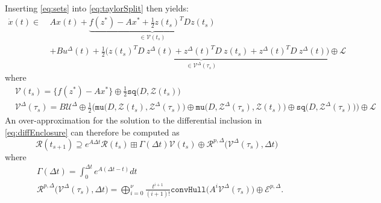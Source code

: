 \documentclass{article}
\begin{document}
Inserting \eqref{eq:sets} into \eqref{eq:taylorSplit} then yields:
\begin{equation}
	\begin{split}
	\dot x(t) \in ~& A x(t) + \underbrace{f(z^*) - A x^* + \frac{1}{2} z(t_s)^T D z(t_s)}_{\in \mathcal{V}(t_s)} \\
	& + \underbrace{B u^{\Delta}(t) + \frac{1}{2}\Big( z(t_s)^T D~ z^{\Delta}(t) + z^{\Delta}(t)^T D ~z(t_s) + z^{\Delta}(t)^T D ~z^{\Delta}(t) \Big) \oplus \mathcal{L}}_{\in \mathcal{V}^{\Delta}(\tau_s)} 
	\end{split}
	\label{eq:diffEnclosure}
\end{equation}
where
\begin{equation*}
	\begin{split}
		& \mathcal{V}(t_s) = \{ f(z^*) - A x^* \} \oplus \frac{1}{2} \texttt{sq}\big(D,\mathcal{Z}(t_s) \big) \\
		& \mathcal{V}^{\Delta}(\tau_s) = B \mathcal{U}^{\Delta} \oplus \frac{1}{2} \Big( \texttt{mu} \big( D,\mathcal{Z}(t_s),\mathcal{Z}^{\Delta}(\tau_s) \big) \oplus \texttt{mu} \big( D,\mathcal{Z}^{\Delta}(\tau_s),\mathcal{Z}(t_s) \big) \oplus \texttt{sq}\big(D,\mathcal{Z}^{\Delta}(\tau_s) \big) \Big) \oplus \mathcal{L}
	\end{split}
\end{equation*}
An over-approximation for the solution to the differential inclusion in \eqref{eq:diffEnclosure} can therefore be computed as 
\begin{equation*}
	\mathcal{R}(t_{s+1}) \supseteq e^{A \Delta t} \mathcal{R}(t_s) \boxplus \Gamma(\Delta t) \mathcal{V}(t_s) \oplus \mathcal{R}^{p,\Delta}\big(\mathcal{V}^{\Delta}(\tau_s),\Delta t \big)
\end{equation*}
where
\begin{equation*}
	\begin{split}
		& \Gamma (\Delta t) = \int_{0}^{\Delta t} e^{A(\Delta t - t)} dt \\
		& \mathcal{R}^{p,\Delta}\big(\mathcal{V}^{\Delta}(\tau_s),\Delta t \big) = \bigoplus_{i = 0}^{\nu} \frac{t^{i+1}}{(i+1)!} \texttt{convHull}\big(A^i \mathcal{V}^{\Delta}(\tau_s) \big) \oplus \mathcal{E}^{p,\Delta}.
	\end{split}
\end{equation*}
\end{document}
